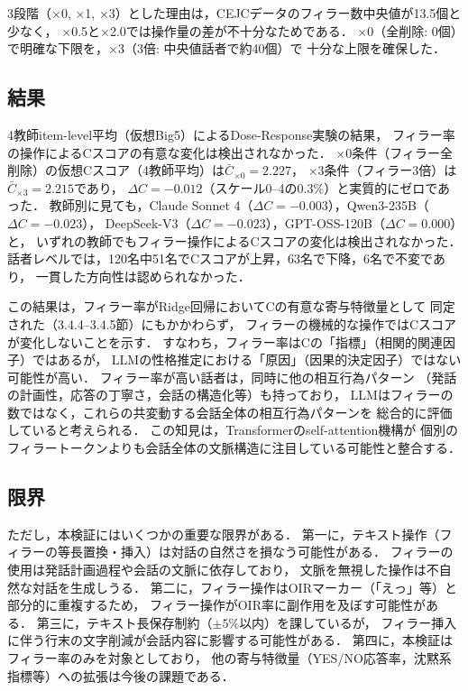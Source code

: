 \documentclass[dvipdfmx,11pt,a4paper]{bxjsarticle}
\renewcommand{\_}{\paperorigunderscore\allowbreak}%
\begin{document}
3段階（×0, ×1, ×3）とした理由は，CEJCデータのフィラー数中央値が13.5個と少なく，
×0.5と×2.0では操作量の差が不十分なためである．
×0（全削除: 0個）で明確な下限を，×3（3倍: 中央値話者で約40個）で
十分な上限を確保した．

\subsection{結果}

4教師item-level平均（仮想Big5）によるDose-Response実験の結果，
フィラー率の操作によるCスコアの有意な変化は検出されなかった．
×0条件（フィラー全削除）の仮想Cスコア（4教師平均）は$\bar{C}_{{\times 0}} = 2.227$，
×3条件（フィラー3倍）は$\bar{C}_{{\times 3}} = 2.215$であり，
$\Delta C = -0.012$（スケール0--4の0.3\%）と実質的にゼロであった．
教師別に見ても，Claude Sonnet 4（$\Delta C = -0.003$），Qwen3-235B（$\Delta C = -0.023$），
DeepSeek-V3（$\Delta C = -0.023$），GPT-OSS-120B（$\Delta C = 0.000$）と，
いずれの教師でもフィラー操作によるCスコアの変化は検出されなかった．
話者レベルでは，120名中51名でCスコアが上昇，63名で下降，6名で不変であり，
一貫した方向性は認められなかった．

この結果は，フィラー率がRidge回帰においてCの有意な寄与特徴量として
同定された（3.4.4--3.4.5節）にもかかわらず，
フィラーの機械的な操作ではCスコアが変化しないことを示す．
すなわち，フィラー率はCの「指標」（相関的関連因子）ではあるが，
LLMの性格推定における「原因」（因果的決定因子）ではない可能性が高い．
フィラー率が高い話者は，同時に他の相互行為パターン
（発話の計画性，応答の丁寧さ，会話の構造化等）も持っており，
LLMはフィラーの数ではなく，これらの共変動する会話全体の相互行為パターンを
総合的に評価していると考えられる．
この知見は，Transformerのself-attention機構が
個別のフィラートークンよりも会話全体の文脈構造に注目している可能性と整合する．

\subsection{限界}
ただし，本検証にはいくつかの重要な限界がある．
第一に，テキスト操作（フィラーの等長置換・挿入）は対話の自然さを損なう可能性がある．
フィラーの使用は発話計画過程や会話の文脈に依存しており\cite{clark1996,watanabe2003}，
文脈を無視した操作は不自然な対話を生成しうる．
第二に，フィラー操作はOIRマーカー（「えっ」等）と部分的に重複するため，
フィラー操作がOIR率に副作用を及ぼす可能性がある．
第三に，テキスト長保存制約（$\pm 5\%$以内）を課しているが，
フィラー挿入に伴う行末の文字削減が会話内容に影響する可能性がある．
第四に，本検証はフィラー率のみを対象としており，
他の寄与特徴量（YES/NO応答率，沈黙系指標等）への拡張は今後の課題である．
\end{document}
